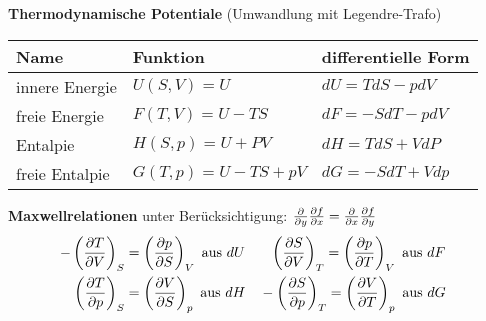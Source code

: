 




{\Huge
\textbf{Thermodynamische Potentiale} (Umwandlung mit Legendre-Trafo)
}%

\begin{table}[h]
\Huge
  \centering
  \begin{tabular}{lll}
    Name&Funktion&differentielle Form\\
\hline
innere Energie&\(U(S,V)=U\)&\(dU = TdS-pdV\)\\
freie Energie&\(F(T,V)=U-TS\)&\(dF=-SdT-pdV\)\\
Entalpie & \(H(S,p)=U+PV\)&\(dH = TdS+VdP\)\\
freie Entalpie & \(G(T,p)=U-TS+pV\)&\(dG = -SdT+Vdp\)

  \end{tabular}
\end{table}
\vphantom{X}
{\Huge
\textbf{Maxwellrelationen} unter Berücksichtigung: \(\pdiff_y \pdiff f_x = \pdiff_x \pdiff f_y \)
\begin{align*}
  -\left(\pdiff T_V\right)_S &= \left(\pdiff p_S\right)_V  \text{ aus }dU \quad 
 \hphantom{-} \left(\pdiff S_V\right)_T = \left(\pdiff p_T\right)_V  \text{ aus }dF \quad \\
 \left(\pdiff T_p\right)_S &= \left(\pdiff V_S\right)_p  \text{ aus }dH \quad
 - \left(\pdiff S_p\right)_T = \left(\pdiff V_T\right)_p  \text{ aus }dG \quad
\end{align*}

}%



